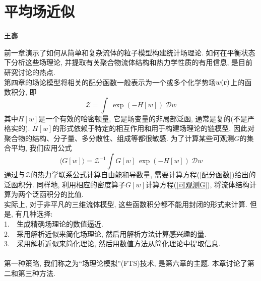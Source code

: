 \section{平均场近似}
{\color{red}\begin{center}
        王鑫
    \end{center}}

前一章演示了如何从简单和复杂流体的粒子模型构建统计场理论. 如何在平衡状态下分析这些场理论, 并提取有关聚合物流体结构和热力学性质的有用信息, 是目前研究讨论的热点. \\

第四章的场论模型将相关的配分函数一般表示为一个或多个化学势场$w(\mathbf{r})$上的函数积分, 即\\
\begin{equation}
	\mathcal{Z}=\int  \ \exp(-H[w])\ \mathcal{D}w \label{配分函数}
\end{equation}
其中$H[w]$是一个有效的哈密顿量, 它是场变量的非局部泛函, 通常是复的(不是严格实的). $H[w]$的形式依赖于特定的相互作用和用于构建场理论的链模型, 因此对聚合物的结构、分子量、多分散性、组成等都很敏感. 为了计算某些可观测$G$的集合平均, 我们应用公式\\
\begin{equation}
	\langle G[w]\rangle = \mathcal{Z}^{-1}\int  G[w]\ \exp(-H[w])\ \mathcal{D}w \label{可观测G}
\end{equation}
通过与$\mathcal{Z}$的热力学联系公式计算自由能和导数量, 需要计算方程(\ref{配分函数})给出的泛函积分. 同样地, 利用相应的密度算子$G[w]$计算方程(\ref{可观测G}), 将流体结构计算为两个泛函积分的比值. \\

实际上, 对于非平凡的三维流体模型, 这些函数积分都不能用封闭的形式来计算. 但是, 有几种选择:\\

1.\ \ 生成精确场理论的数值逼近. \\

2.\ \ 采用解析近似来简化场理论, 然后用解析方法计算感兴趣的量. \\

3.\ \ 采用解析近似来简化理论, 然后用数值方法从简化理论中提取信息. \\
\\
第一种策略, 我们称之为“场理论模拟”(FTS)技术, 是第六章的主题. 本章讨论了第二和第三种方法. \\
